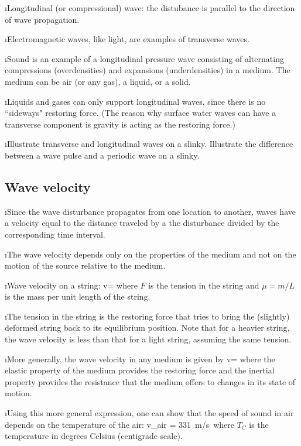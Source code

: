 \i Longitudinal (or compressional) wave: 
the distubance is parallel to the direction of 
wave propagation.

\i Electromagnetic waves, like light, are examples
of transverse waves.

\i Sound is an example of a longitudinal pressure wave 
consisting
of alternating compressions (overdensities) 
and expansions (underdensities) in a medium.
The medium can be air (or any gas), a liquid, or a solid.

\i Liquids and gases can only support 
longitudinal waves, since there is no ``sideways" 
restoring force.
(The reason why surface water waves can have a 
transverse component is gravity is acting as the
restoring force.)

\i \demo Illustrate transverse and longitudinal waves on a slinky.
Illustrate the difference between a wave pulse and 
a periodic wave on a slinky.

\ei

\subsection{Wave velocity}

\bi

\i Since the wave disturbance propagates from one location 
to another, waves have a velocity equal to the distance
traveled by a the disturbance divided by the corresponding time
interval.

\i The wave velocity depends only on the properties of
the medium and not on the motion of the source relative
to the medium.

\i Wave velocity on a string: 
%
\be
v=
\ee
%
where $F$ is the tension in the string and $\mu=m/L$ is the
mass per unit length of the string.

\i The tension in the string is the restoring force that
tries to bring the (slightly) deformed string back to its equilibrium
position.
Note that for a heavier string, the wave velocity is
less than that for a light string, assuming the same tension.

\i More generally, the wave velocity in any medium is
given by 
%
\be
v=
\ee
%
where the elastic property of the medium provides the restoring 
force and the inertial property provides the resistance that 
the medium offers to changes in its state of motion.

\i Using this more general expression, one can show that 
the speed of sound in air depends on the temperature of 
the air:
%
\be
v_{\rm air} = 331~{\rm m/s}\,
\ee
%
where $T_C$ is the temperature in degrees Celsius 
(centigrade scale).

